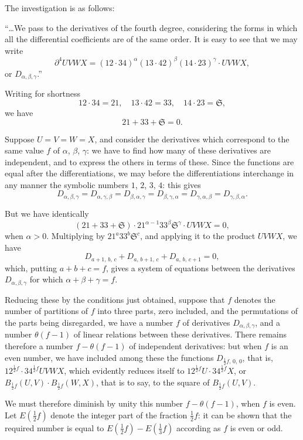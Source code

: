 \documentclass[11pt,a4paper]{book}
\begin{document}
The investigation is as follows:

``\ldots We pass to the derivatives of the fourth degree, considering the forms in which all the differential coefficients are of the same order. It is easy to see that we may write
\[
\partial^4 UVWX = (12 \cdot 34)^\alpha (13 \cdot 42)^\beta (14 \cdot 23)^\gamma \cdot UVWX,
\]
or $D_{\alpha,\beta,\gamma}$.''

\medskip

Writing for shortness
\[
12 \cdot 34 = 21, \quad 13 \cdot 42 = 33, \quad 14 \cdot 23 = \mathfrak{S},
\]
we have
\[
21 + 33 + \mathfrak{S} = 0.
\]

Suppose $U = V = W = X$, and consider the derivatives which correspond to the same value $f$ of $\alpha$, $\beta$, $\gamma$: we have to find how many of these derivatives are independent, and to express the others in terms of these. Since the functions are equal after the differentiations, we may before the differentiations interchange in any manner the symbolic numbers $1$, $2$, $3$, $4$: this gives
\[
D_{\alpha,\beta,\gamma} = D_{\alpha,\gamma,\beta} = D_{\beta,\alpha,\gamma} = D_{\beta,\gamma,\alpha} = D_{\gamma,\alpha,\beta} = D_{\gamma,\beta,\alpha}.
\]

But we have identically
\[
(21 + 33 + \mathfrak{S}) \cdot 21^{\alpha-1} 33^\beta \mathfrak{S}^\gamma \cdot UVWX = 0,
\]
when $\alpha > 0$. Multiplying by $21^a 33^b \mathfrak{S}^c$, and applying it to the product $UVWX$, we have
\[
D_{a+1,\,b,\,c} + D_{a,\,b+1,\,c} + D_{a,\,b,\,c+1} = 0,
\]
which, putting $a + b + c = f$, gives a system of equations between the derivatives $D_{\alpha,\beta,\gamma}$ for which $\alpha + \beta + \gamma = f$.

Reducing these by the conditions just obtained, suppose that $f$ denotes the number of partitions of $f$ into three parts, zero included, and the permutations of the parts being disregarded, we have a number $f$ of derivatives $D_{\alpha,\beta,\gamma}$, and a number $\theta(f - 1)$ of linear relations between these derivatives. There remains therefore a number $f - \theta(f - 1)$ of independent derivatives: but when $f$ is an even number, we have included among these the functions $D_{\frac{1}{2}f,\,0,\,0}$, that is, $12^{\frac{1}{2}f} \cdot 34^{\frac{1}{2}f}UVWX$, which evidently reduces itself to $12^{\frac{1}{2}f}U \cdot 34^{\frac{1}{2}f}X$, or $B_{\frac{1}{2}f}(U,V) \cdot B_{\frac{1}{2}f}(W,X)$, that is to say, to the square of $B_{\frac{1}{2}f}(U,V)$.

We must therefore diminish by unity this number $f - \theta(f - 1)$, when $f$ is even. Let $E(\frac{1}{2}f)$ denote the integer part of the fraction $\frac{1}{2}f$: it can be shown that the required number is equal to $E(\frac{1}{2}f) - E(\frac{1}{3}f)$ according as $f$ is even or odd.
\end{document}

